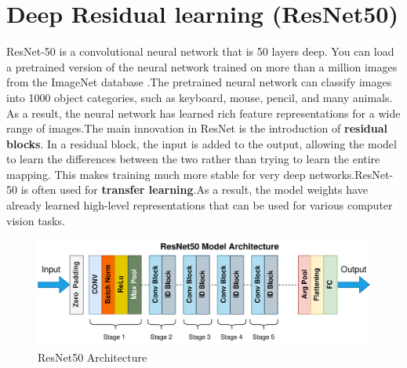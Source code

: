 \section{Deep Residual learning (ResNet50)}
ResNet-50 is a convolutional neural network that is 50 layers deep. You can load a pretrained version of the neural network trained on more than a million images from the ImageNet database \cite{imagenet}.The pretrained neural network can classify images into 1000 object categories, such as keyboard, mouse, pencil, and many animals. As a result, the neural network has learned rich feature representations for a wide range of images.The main innovation in ResNet is the introduction of \textbf{residual blocks}. In a residual block, the input is added to the output, allowing the model to learn the differences between the two rather than trying to learn the entire mapping. This makes training much more stable for very deep networks.ResNet-50 is often used for \textbf{transfer learning}.As a result, the model weights have already learned high-level representations that can be used for various computer vision tasks.
\begin{figure}[hbtp]
\caption{ResNet50 Architecture}
\centering
\includegraphics[scale=0.3]{../Images/resnet50arch.png}
\end{figure}
